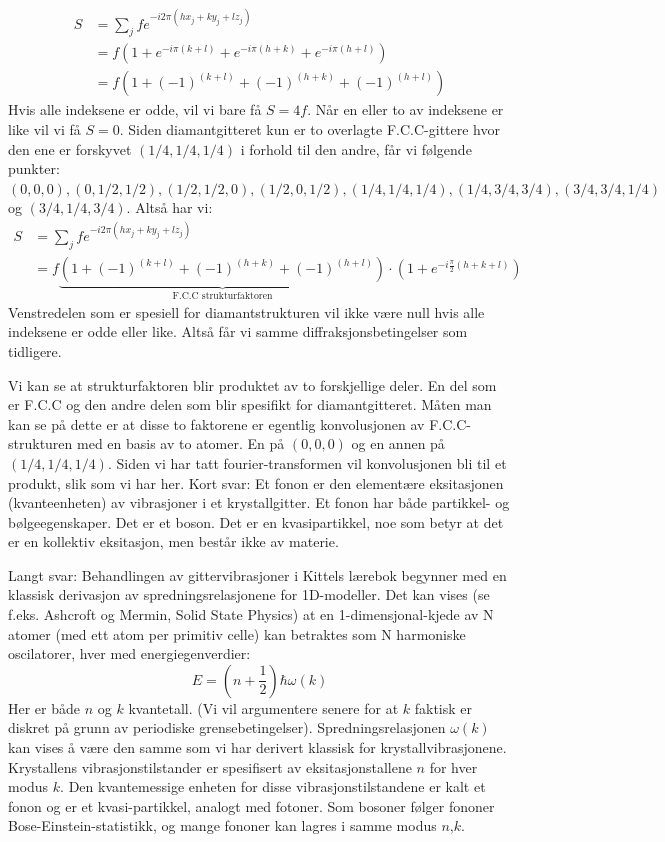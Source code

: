 \documentclass{article}
\begin{document}
\begin{align}
    S &= \sum_j f e^{-i 2 \pi(h x_j + k y_j + l z_j)} \\
    &= f\left(1 + e^{-i \pi (k + l)} + e^{-i \pi (h + k)} + e^{-i \pi (h+l)} \right)\\
    &= f\left(1 + (-1)^{(k + l)} +  (-1)^{(h + k)} + (-1)^{ (h+l)} \right)
\end{align}
Hvis alle indeksene er odde, vil vi bare få $ S =4f$. Når en eller to av indeksene er like vil vi få $S=0$.
Siden diamantgitteret kun er to overlagte F.C.C-gittere hvor den ene er forskyvet $(1/4, 1/4, 1/4)$ i forhold til den andre, får vi følgende punkter: $(0,0,0), (0, 1/2, 1/2), (1/2, 1/2,0), (1/2, 0, 1/2), (1/4, 1/4, 1/4), (1/4, 3/4,  3/4), ( 3/4, 3/4,1/4)$ og $ ( 3/4, 1/4,  3/4)$. Altså har vi:
\begin{align}
   S &= \sum_j f e^{-i 2 \pi(h x_j + k y_j + l z_j)}  \\
   &= f\underbrace{\left(1 + (-1)^{(k + l)} +  (-1)^{(h + k)} + (-1)^{ (h+l)} \right) }_{\text{F.C.C strukturfaktoren}}\cdot (1 + e^{-i \frac{\pi}{2} (h+k+l)})
\end{align}
Venstredelen som er spesiell for diamantstrukturen vil ikke være null hvis alle indeksene er odde eller like. Altså får vi samme diffraksjonsbetingelser som tidligere.

Vi kan se at strukturfaktoren blir produktet av to forskjellige deler. En del som er F.C.C og den andre delen som blir spesifikt for diamantgitteret. Måten man kan se på dette er at disse to faktorene er egentlig konvolusjonen av F.C.C-strukturen med en basis av to atomer. En på $(0,0,0)$ og en annen på $(1/4, 1/4, 1/4)$. Siden vi har tatt fourier-transformen vil konvolusjonen bli til et produkt, slik som vi har her.
\nyside
{}
Kort svar: Et fonon er den elementære eksitasjonen (kvanteenheten) av vibrasjoner i et krystallgitter. Et fonon har både partikkel- og bølgeegenskaper. Det er et boson. Det er en kvasipartikkel, noe som betyr at det er en kollektiv eksitasjon, men består ikke av materie.

Langt svar: Behandlingen av gittervibrasjoner i Kittels lærebok begynner med en klassisk derivasjon av spredningsrelasjonene for 1D-modeller. Det kan vises (se f.eks. Ashcroft og Mermin, Solid State Physics) at en 1-dimensjonal-kjede av N atomer (med ett atom per primitiv celle) kan betraktes som N harmoniske oscilatorer, hver med energiegenverdier:
\begin{equation}
    E = \left(n + \frac{1}{2}\right)\hbar \omega(k)
\end{equation}
Her er både $n$ og $k$ kvantetall. (Vi vil argumentere senere for at $k$ faktisk er diskret på grunn av periodiske grensebetingelser). Spredningsrelasjonen $\omega(k)$ kan vises å være den samme som vi har derivert klassisk for krystallvibrasjonene. Krystallens vibrasjonstilstander er spesifisert av eksitasjonstallene $n$ for hver modus $k$. Den kvantemessige enheten for disse vibrasjonstilstandene er kalt et fonon og er et kvasi-partikkel, analogt med fotoner. Som bosoner følger fononer Bose-Einstein-statistikk, og mange fononer kan lagres i samme modus $n$,$k$.
\end{document}

